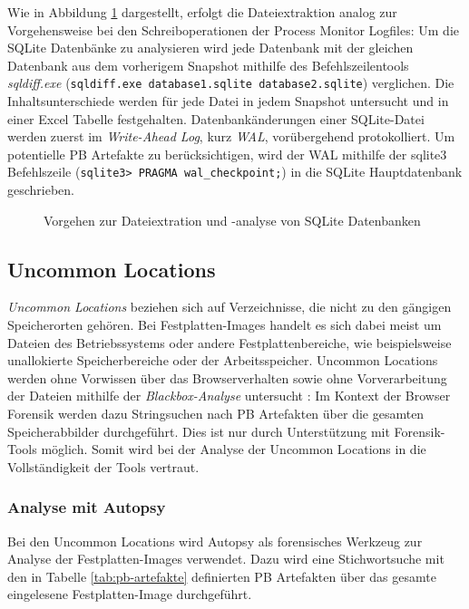Wie in Abbildung \ref{img:dateiextraktion-und-analyse-sqlite} dargestellt, erfolgt die Dateiextraktion analog zur Vorgehensweise bei den Schreiboperationen der Process Monitor Logfiles: Um die SQLite Datenbänke zu analysieren wird jede Datenbank mit der gleichen Datenbank aus dem vorherigem Snapshot mithilfe des Befehlszeilentools \textit{sqldiff.exe} (\texttt{sqldiff.exe database1.sqlite database2.sqlite}) verglichen. Die Inhaltsunterschiede werden für jede Datei in jedem Snapshot untersucht und in einer Excel Tabelle festgehalten.
Datenbankänderungen einer SQLite-Datei werden zuerst im \textit{Write-Ahead Log}, kurz \textit{WAL}, vorübergehend protokolliert. 
Um potentielle PB Artefakte zu berücksichtigen, wird der WAL mithilfe der sqlite3 Befehlszeile (\texttt{sqlite3> PRAGMA wal\_checkpoint;}) in die SQLite Hauptdatenbank geschrieben.
\begin{figure}[h!]
	\centering
	\small
	\centerline{\resizebox{\linewidth}{!}{}}
	\caption{Vorgehen zur Dateiextration und -analyse von SQLite Datenbanken}
	\label{img:dateiextraktion-und-analyse-sqlite}
\end{figure}

\subsection{Uncommon Locations}
\label{subsection:methodik-datenanalyse-uncommonlocations}
\textit{Uncommon Locations} beziehen sich auf Verzeichnisse, die nicht zu den gängigen Speicherorten gehören. 
Bei Festplatten-Images handelt es sich dabei meist um Dateien des Betriebssystems oder andere Festplattenbereiche, wie beispielsweise unallokierte Speicherbereiche oder der Arbeitsspeicher.
Uncommon Locations werden ohne Vorwissen über das Browserverhalten sowie ohne Vorverarbeitung der Dateien mithilfe der \textit{Blackbox-Analyse} untersucht \cite{Bonetti.2014}:
Im Kontext der Browser Forensik werden dazu Stringsuchen nach PB Artefakten über die gesamten Speicherabbilder durchgeführt.
Dies ist nur durch Unterstützung mit Forensik-Tools möglich. Somit wird bei der Analyse der Uncommon Locations in die Vollständigkeit der Tools vertraut.

\subsubsection*{Analyse mit Autopsy}
\label{subsubsection:methodik-datenanalyse-uncommonlocations-analysemitautopsy}
Bei den Uncommon Locations wird Autopsy als forensisches Werkzeug zur Analyse der Festplatten-Images verwendet.
Dazu wird eine Stichwortsuche mit den in Tabelle \ref{tab:pb-artefakte} definierten PB Artefakten über das gesamte eingelesene Festplatten-Image durchgeführt.

